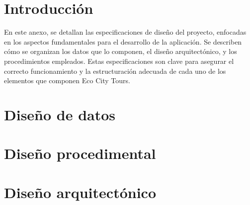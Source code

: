 
\section{Introducción}
En este anexo, se detallan las especificaciones de diseño del proyecto, enfocadas en los aspectos fundamentales para el desarrollo de la aplicación. Se describen cómo se organizan los datos que lo componen, el diseño arquitectónico, y los procedimientos empleados. Estas especificaciones son clave para asegurar el correcto funcionamiento y la estructuración adecuada de cada uno de los elementos que componen Eco City Tours.
\section{Diseño de datos}

\section{Diseño procedimental}

\section{Diseño arquitectónico}


